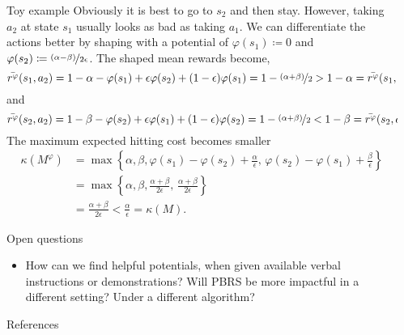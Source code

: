 \documentclass[final]{beamer}
\newlength{\sepwidth}
\newlength{\colwidth}
\newcommand{\separatorcolumn}{\begin{column}{\sepwidth}\end{column}}
\begin{document}
\begin{frame}[t]
\begin{columns}[t]
\begin{column}{\colwidth}
\begin{block}{Toy example}
  Obviously it is best to go to $s_2$ and then stay. However, taking $a_2$ at state $s_1$ usually looks as bad as taking $a_1$. We can differentiate the actions better by shaping with a potential of $\varphi(s_1) \coloneqq 0$ and $\varphi(s_2) \coloneqq \nicefrac{(\alpha - \beta)}{2 \epsilon}$. The shaped mean rewards become,
  $$ \bar{r^\varphi}(s_1, a_2) = 1 - \alpha - \varphi(s_1) + \epsilon \varphi(s_2) + (1 - \epsilon) \varphi(s_1) = 1 - \nicefrac{(\alpha + \beta)}{2} > 1 - \alpha = \bar{r^\varphi}(s_1, a_1) $$
  and
  $$ \bar{r^\varphi}(s_2, a_2) = 1 - \beta - \varphi(s_2) + \epsilon \varphi(s_1) + (1 - \epsilon) \varphi(s_2) = 1 - \nicefrac{(\alpha + \beta)}{2} < 1 - \beta = \bar{r^\varphi}(s_2, a_1). $$
  The maximum expected hitting cost becomes smaller
  \begin{align*}
    \kappa(M^\varphi) &= \max \left\{ \alpha, \beta, \varphi(s_1) - \varphi(s_2) + \frac{\alpha}{\epsilon}, \, \varphi(s_2) - \varphi(s_1) + \frac{\beta}{\epsilon} \right\} \\
    &= \max \left\{ \alpha, \beta, \frac{\alpha + \beta}{2 \epsilon}, \, \frac{\alpha + \beta}{2 \epsilon} \right\} \\
    &= \frac{\alpha + \beta}{2 \epsilon} < \frac{\alpha}{\epsilon} = \kappa(M).
  \end{align*}
  \end{block}

  \begin{block}{Open questions}
  \begin{itemize}
      \item How can we find helpful potentials, when given available verbal instructions or demonstrations? Will PBRS be more impactful in a different setting? Under a different algorithm?
  \end{itemize}
  \end{block}

  \begin{block}{References}

    \nocite{*}
    \footnotesize{}

  \end{block}

\end{column}

\separatorcolumn
\end{columns}

\end{frame}
\end{document}
